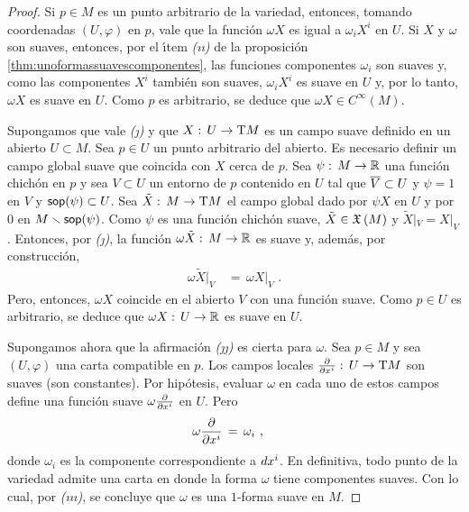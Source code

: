 \begin{proof}
	Si $p\in M$ es un punto arbitrario de la variedad, entonces,
	tomando coordenadas $(U,\varphi)$ en $p$, vale que la funci\'{o}n
	$\omega X$ es igual a $\omega_{i}X^{i}$ en $U$. Si $X$ y $\omega$
	son suaves, entonces, por el \'{\i}tem \textit{(\i\i)} de
	la proposici\'{o}n \ref{thm:unoformassuavescomponentes}, las funciones
	componentes $\omega_{i}$ son suaves y, como las componentes
	$X^{i}$ tambi\'{e}n son suaves, $\omega_{i}X^{i}$ es suave en $U$
	y, por lo tanto, $\omega X$ es suave en $U$. Como $p$ es arbitrario,
	se deduce que $\omega X\in C^{\infty}(M)$.

	Supongamos que vale \textit{(\j)} y que $X:\,U\rightarrow\tangente{M}$
	es un campo suave definido en un abierto $U\subset M$. Sea $p\in U$
	un punto arbitrario del abierto. Es necesario definir un campo global
	suave que coincida con $X$ cerca de $p$. Sea
	$\psi:\,M\rightarrow\mathbb{R}$ una funci\'{o}n chich\'{o}n en $p$ y sea
	$V\subset U$ un entorno de $p$ contenido en $U$ tal que
	$\overline{V}\subset U$ y $\psi=1$ en $V$ y $\mathsf{sop}(\psi)\subset U$.
	Sea $\tilde{X}:\,M\rightarrow\tangente{M}$ el campo global dado
	por $\psi X$ en $U$ y por $0$ en $M\smallsetminus\mathsf{sop}(\psi)$. Como
	$\psi$ es una funci\'{o}n chich\'{o}n suave, $\tilde{X}\in\mathfrak{X}\left(M\right)$
	y $\tilde{X}|_{V}=X|_{V}$. Entonces, por \textit{(\j)}, la funci\'{o}n
	$\omega\tilde{X}:\,M\rightarrow\mathbb{R}$ es suave y, adem\'{a}s, por
	construcci\'{o}n,
	\begin{align*}
		\omega\tilde{X}|_{V} & \,=\,\omega X|_{V}
		\text{ .}
	\end{align*}
	Pero, entonces, $\omega X$ coincide en el abierto $V$ con una
	funci\'{o}n suave. Como $p\in U$ es arbitrario, se deduce que
	$\omega X:\,U\rightarrow\mathbb{R}$ es suave en $U$.

	Supongamos ahora que la afirmaci\'{o}n \textit{(\j\j)} es cierta
	para $\omega$. Sea $p\in M$ y sea $(U,\varphi)$ una carta compatible
	en $p$. Los campos locales $\gancho{x^{i}}:\,U\rightarrow\tangente{M}$
	son suaves (son constantes). Por hip\'{o}tesis, evaluar $\omega$ en
	cada uno de estos campos define una funci\'{o}n suave
	$\omega\gancho{x^{i}}$ en $U$. Pero
	\begin{align*}
		\omega\gancho{x^{i}} & \,=\,\omega_{i}
		\text{ ,}
	\end{align*}
	donde $\omega_{i}$ es la componente correspondiente a
	$\de{x^{i}}$. En definitiva, todo punto de la variedad admite una
	carta en donde la forma $\omega$ tiene componentes suaves.
	Con lo cual, por \textit{(\i\i\i)}, se concluye que $\omega$ es una
	$1$-forma suave en $M$.
\end{proof}

